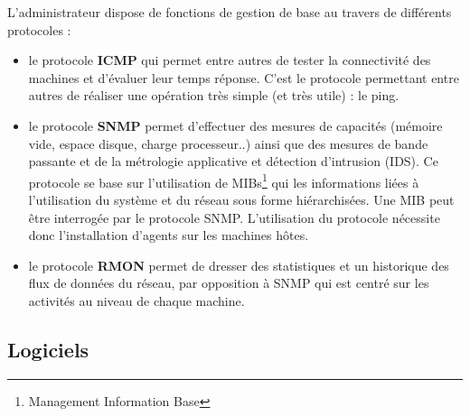 \documentclass[a4paper]{article}
\begin{document}
L'administrateur dispose de fonctions de gestion de base au travers de différents protocoles :
\begin{itemize}
\item le protocole \textbf{ICMP} qui permet entre autres de tester la connectivité des machines et d'évaluer leur temps réponse. C'est le protocole permettant entre autres de réaliser une opération très simple (et très utile) : le ping. 
\item le protocole \textbf{SNMP} permet d'effectuer des mesures de capacités (mémoire vide, espace disque, charge processeur..) ainsi que des mesures de bande passante et de la métrologie applicative et détection d'intrusion (IDS). Ce protocole se base sur l'utilisation de MIBs\footnote{Management Information Base} qui les informations liées à l'utilisation du système et du réseau sous forme hiérarchisées. Une MIB peut être interrogée par le protocole SNMP. L'utilisation du protocole nécessite donc l'installation d'agents sur les machines hôtes.
\item le protocole \textbf{RMON} permet de dresser des statistiques et un historique des flux de données du réseau, par opposition à SNMP qui est centré sur les activités au niveau de chaque machine.
\end{itemize}

\subsection{Logiciels}
\end{document}
